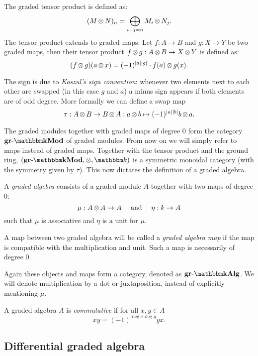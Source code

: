 \begin{definition}
	The graded tensor product is defined as:
	$$ (M \operatorname*{\otimes} N)_n = \bigoplus_{i + j = n} M_i \operatorname*{\otimes} N_j. $$
	The tensor product extends to graded maps. Let $f: A \to B$ and $g:X \to Y$ be two graded maps, then their tensor product $f \operatorname*{\otimes} g: A \operatorname*{\otimes} B \to X \operatorname*{\otimes} Y$ is defined as:
	$$ (f \operatorname*{\otimes} g)(a \operatorname*{\otimes} x) = (-1)^{{|{a}|}{|{g}|}} \cdot f(a) \operatorname*{\otimes} g(x). $$
\end{definition}

The sign is due to \emph{Koszul's sign convention}: whenever two elements next to each other are swapped (in this case $g$ and $a$) a minus sign appears if both elements are of odd degree. More formally we can define a swap map
$$ \tau : A \operatorname*{\otimes} B \to B \operatorname*{\otimes} A : a \operatorname*{\otimes} b \mapsto (-1)^{{|{a}|}{|{b}|}} b \operatorname*{\otimes} a. $$

The graded modules together with graded maps of degree $0$ form the category $\grMod{\k}$ of graded modules. From now on we will simply refer to maps instead of graded maps. Together with the tensor product and the ground ring, $(\grMod{\k}, \tensor, \k)$ is a symmetric monoidal category (with the symmetry given by $\tau$). This now dictates the definition of a graded algebra.

\begin{definition}
	A \emph{graded algebra} consists of a graded module $A$ together with two maps of degree $0$:
	$$ \mu: A \operatorname*{\otimes} A \to A \quad\text{ and }\quad \eta: k \to A $$
	such that $\mu$ is associative and $\eta$ is a unit for $\mu$.

	A map between two graded algebra will be called a \emph{graded algebra map} if the map is compatible with the multiplication and unit. Such a map is necessarily of degree $0$.
\end{definition}

Again these objects and maps form a category, denoted as $\grAlg{\k}$. We will denote multiplication by a dot or juxtaposition, instead of explicitly mentioning $\mu$.

\begin{definition}
	A graded algebra $A$ is \emph{commutative} if for all $x, y \in A$
	$$ xy = (-1)^{\deg{x}\deg{y}} yx. $$
\end{definition}


\subsection{Differential graded algebra}

